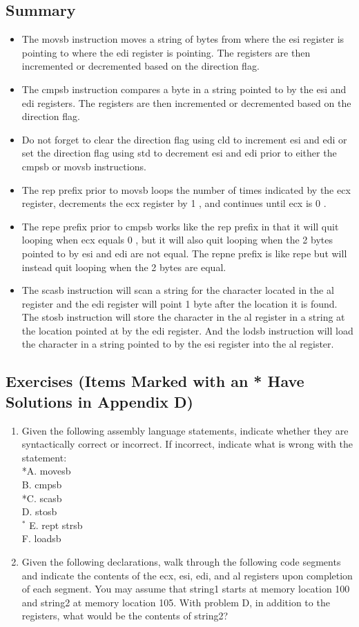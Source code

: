 \documentclass[10pt]{article}
\begin{document}
\subsection*{Summary}
\begin{itemize}
  \item The movsb instruction moves a string of bytes from where the esi register is pointing to where the edi register is pointing. The registers are then incremented or decremented based on the direction flag.
  \item The cmpsb instruction compares a byte in a string pointed to by the esi and edi registers. The registers are then incremented or decremented based on the direction flag.
  \item Do not forget to clear the direction flag using cld to increment esi and edi or set the direction flag using std to decrement esi and edi prior to either the cmpsb or movsb instructions.
  \item The rep prefix prior to movsb loops the number of times indicated by the ecx register, decrements the ecx register by 1 , and continues until ecx is 0 .
  \item The repe prefix prior to cmpsb works like the rep prefix in that it will quit looping when ecx equals 0 , but it will also quit looping when the 2 bytes pointed to by esi and edi are not equal. The repne prefix is like repe but will instead quit looping when the 2 bytes are equal.
  \item The scasb instruction will scan a string for the character located in the al register and the edi register will point 1 byte after the location it is found. The stosb instruction will store the character in the al register in a string at the location pointed at by the edi register. And the lodsb instruction will load the character in a string pointed to by the esi register into the al register.
\end{itemize}

\subsection*{Exercises (Items Marked with an * Have Solutions in Appendix D)}
\begin{enumerate}
  \item Given the following assembly language statements, indicate whether they are syntactically correct or incorrect. If incorrect, indicate what is wrong with the statement:\\
*A. movesb\\
B. cmpsb\\
*C. scasb\\
D. stosb\\
${ }^{*}$ E. rept strsb\\
F. loadsb
  \item Given the following declarations, walk through the following code segments and indicate the contents of the ecx, esi, edi, and al registers upon completion of each segment. You may assume that string1 starts at memory location 100 and string2 at memory location 105. With problem D, in addition to the registers, what would be the contents of string2?
\end{enumerate}
\end{document}
